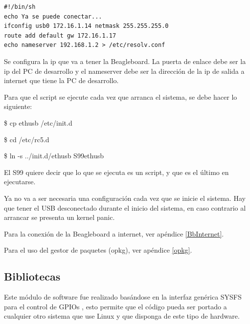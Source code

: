 \begin{verbatim}
#!/bin/sh 
echo Ya se puede conectar... 
ifconfig usb0 172.16.1.14 netmask 255.255.255.0 
route add default gw 172.16.1.17 
echo nameserver 192.168.1.2 > /etc/resolv.conf 
\end{verbatim}

Se configura la ip que va a tener la Beagleboard. La puerta de enlace debe ser la ip del PC de desarrollo y el nameserver debe ser la dirección de la ip de salida a internet que tiene la PC de desarrollo.

\bigskip
Para que el script se ejecute cada vez que arranca el sistema, se debe hacer lo siguiente:

\bigskip
\centerline{\$ cp ethusb /etc/init.d}

\centerline{\$ cd /etc/rc5.d}

\centerline{\$ ln -s ../init.d/ethusb S99ethusb}

El S99 quiere decir que lo que se ejecuta es un script, y que es el último en ejecutarse.

\bigskip
Ya no va a ser necesaria una configuración cada vez que se inicie el sistema. 
Hay que tener el USB desconectado durante el inicio del sistema, en caso contrario al arrancar se presenta un kernel panic.

Para la conexión de la Beagleboard a internet, ver apéndice \ref{BbInternet}. 

Para el uso del gestor de paquetes (opkg), ver apéndice \ref{opkg}. 


\subsection{Bibliotecas}


Este módulo de software fue realizado basándose en la interfaz genérica SYSFS para el control de GPIOs \cite{gpio} \cite{gpioK}, esto permite que el código pueda ser portado a cualquier otro sistema que use Linux y que disponga de este tipo de hardware.

